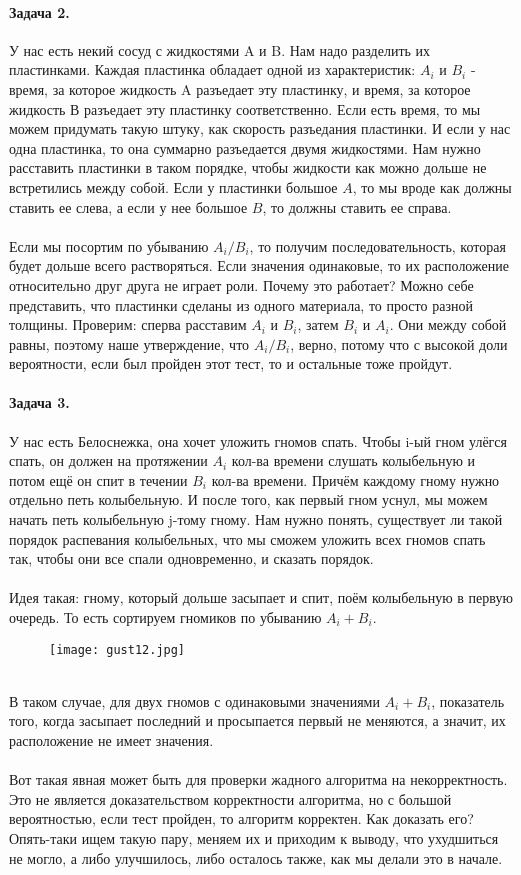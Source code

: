 \documentclass[a4paper,12pt]{article}
\begin{document}
\paragraph{Задача 2.} У нас есть некий сосуд с жидкостями A и B. Нам надо разделить их пластинками. Каждая пластинка обладает одной из характеристик: $A_i$ и $B_i$ - время, за которое жидкость A разъедает эту пластинку, и время, за которое жидкость В разъедает эту пластинку соответственно. Если есть время, то мы можем придумать такую штуку, как скорость разъедания пластинки. И если у нас одна пластинка, то она суммарно разъедается двумя жидкостями. Нам нужно расставить пластинки в таком порядке, чтобы жидкости как можно дольше не встретились между собой. Если у пластинки большое $A$, то мы вроде как должны ставить ее слева, а если у нее большое $B$, то должны ставить ее справа. \\ \\ Если мы посортим по убыванию $A_i/B_i$, то получим последовательность, которая будет дольше всего растворяться. Если значения одинаковые, то их расположение относительно друг друга не играет роли. Почему это работает? Можно себе представить, что пластинки сделаны из одного материала, то просто разной толщины. Проверим: сперва расставим $A_i$ и $B_i$, затем $B_i$ и $A_i$. Они между собой равны, поэтому наше утверждение, что $A_i/B_i$, верно, потому что с высокой доли вероятности, если был пройден этот тест, то и остальные тоже пройдут.\\
\paragraph{Задача 3.} У нас есть Белоснежка, она хочет уложить гномов спать. Чтобы i-ый гном улёгся спать, он должен на протяжении $A_i$ кол-ва времени слушать колыбельную и потом ещё он спит в течении $B_i$ кол-ва времени. Причём каждому гному нужно отдельно петь колыбельную. И после того, как первый гном уснул, мы можем начать петь колыбельную j-тому гному. Нам нужно понять, существует ли такой порядок распевания колыбельных, что мы сможем уложить всех гномов спать так, чтобы они все спали одновременно, и сказать порядок.\\
\\
Идея такая: гному, который дольше засыпает и спит, поём колыбельную в первую очередь. То есть сортируем гномиков по убыванию $A_i + B_i$.
\begin{figure}[h]
\centering
\texttt{[image: gust12.jpg]}
\end{figure}
\\
В таком случае, для двух гномов с одинаковыми значениями $A_i + B_i$, показатель того, когда засыпает последний и просыпается первый не меняются, а значит, их расположение не имеет значения. \\
\\
Вот такая явная может быть для проверки жадного алгоритма на некорректность. Это не является доказательством корректности алгоритма, но с большой вероятностью, если тест пройден, то алгоритм корректен. Как доказать его? Опять-таки ищем такую пару, меняем их и приходим к выводу, что ухудшиться не могло, а либо улучшилось, либо осталось также, как мы делали это в начале. 
\end{document}
